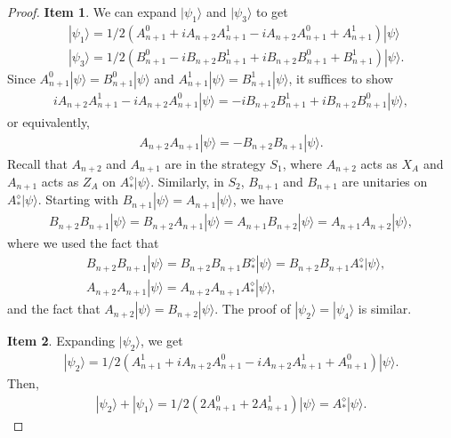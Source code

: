 \documentclass[11pt,letterpaper]{article}
\newcommand{\ket}[1]{|#1\rangle}
\newcommand{\1}{\mathbb{1}}
\theoremstyle{definition}
\begin{document}
\begin{proof}
	\textbf{Item 1}. We can expand $\ket{\psi_1}$ and $\ket{\psi_3}$ to get
	\begin{align}
		&\ket{\psi_1} = 1/2(A_{n+1}^0 + iA_{n+2}A_{n+1}^1 - iA_{n+2}A_{n+1}^0 +A_{n+1}^1) \ket{\psi} \\
		&\ket{\psi_3} = 1/2(B_{n+1}^0 - iB_{n+2}B_{n+1}^1+iB_{n+2}B_{n+1}^0 + B_{n+1}^1)\ket{\psi}.
	\end{align}
	Since $A_{n+1}^0 \ket{\psi} = B_{n+1}^0 \ket{\psi}$ and $A_{n+1}^1 \ket{\psi} = B_{n+1}^1 \ket{\psi}$,
	it suffices to show
	\begin{align}
		iA_{n+2}A_{n+1}^1 - iA_{n+2}A_{n+1}^0 \ket{\psi} = - iB_{n+2}B_{n+1}^1+iB_{n+2}B_{n+1}^0\ket{\psi},
	\end{align}
	or equivalently,
	\begin{align}
		A_{n+2}A_{n+1} \ket{\psi} = -B_{n+2}B_{n+1} \ket{\psi}.
	\end{align}
	Recall that $A_{n+2}$ and $A_{n+1}$ are in the strategy $S_1$, where $A_{n+2}$ acts as $X_A$ 
	and $A_{n+1}$ acts as $Z_A$ on $A_\ast^\diamond \ket{\psi}$.
	Similarly, in $S_2$, $B_{n+1}$ and $B_{n+1}$ are unitaries on $A_\ast^\diamond \ket{\psi}$.
	Starting with $B_{n+1} \ket{\psi} = A_{n+1}\ket{\psi}$, we have
	\begin{align}
		B_{n+2}B_{n+1}\ket{\psi} = B_{n+2}A_{n+1}\ket{\psi} =A_{n+1} B_{n+2}\ket{\psi} = A_{n+1}A_{n+2}\ket{\psi},
	\end{align}
	where we used the fact that
	\begin{align}
	&B_{n+2}B_{n+1}\ket{\psi} = B_{n+2}B_{n+1}B_\ast^\diamond \ket{\psi} = B_{n+2}B_{n+1}A_\ast^\diamond \ket{\psi},\\
	&A_{n+2}A_{n+1}\ket{\psi} = A_{n+2}A_{n+1}A_\ast^\diamond \ket{\psi},
	\end{align}
	and the fact that $A_{n+2}\ket{\psi} = B_{n+2}\ket{\psi}$.
	The proof of $\ket{\psi_2} = \ket{\psi_4}$ is similar.
	
	\textbf{Item 2}. Expanding $\ket{\psi_2}$, we get
	\begin{align}
		\ket{\psi_2} = 1/2(A_{n+1}^1 + iA_{n+2}A_{n+1}^0 -iA_{n+2}A_{n+1}^1 + A_{n+1}^0)\ket{\psi}.
	\end{align}
	Then,
	\begin{align}
		\ket{\psi_2} + \ket{\psi_1} = 1/2( 2A_{n+1}^0 + 2A_{n+1}^1) \ket{\psi} = A_\ast^\diamond \ket{\psi}.
	\end{align}
	

\end{proof}
\end{document}
